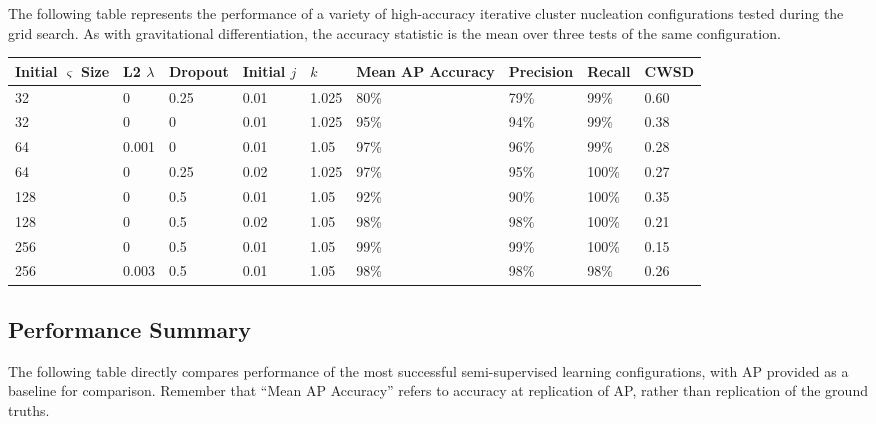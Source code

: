 \documentclass[10pt]{article}
\begin{document}
The following table represents the performance of a variety of high-accuracy iterative cluster nucleation configurations tested during the grid search. As with gravitational differentiation, the accuracy statistic is the mean over three tests of the same configuration.

\begin{minipage}{\textwidth}
    \begin{center}
        \begin{tabular}{|l|l|l|l|l|l|l|l|l|}
            \hline
            Initial $\varsigma$ Size & L2 $\lambda$ & Dropout & Initial $j$ & $k$ & Mean AP Accuracy & Precision & Recall & CWSD \\
            \hline
            32 & 0 & 0.25 & 0.01 & 1.025 & 80\% & 79\% & 99\% & 0.60 \\
            \hline
            32 & 0 & 0 & 0.01 & 1.025 & 95\% & 94\% & 99\% & 0.38 \\
            \hline
            64 & 0.001 & 0 & 0.01 & 1.05 & 97\% & 96\% & 99\% & 0.28 \\
            \hline
            64 & 0 & 0.25 & 0.02 & 1.025 & 97\% & 95\% & 100\% & 0.27 \\
            \hline
            128 & 0 & 0.5 & 0.01 & 1.05 & 92\% & 90\% & 100\% & 0.35 \\
            \hline
            128 & 0 & 0.5 & 0.02 & 1.05 & 98\% & 98\% & 100\% & 0.21 \\
            \hline
            256 & 0 & 0.5 & 0.01 & 1.05 & 99\% & 99\% & 100\% & 0.15 \\
            \hline
            256 & 0.003 & 0.5 & 0.01 & 1.05 & 98\% & 98\% & 98\% & 0.26 \\
            \hline
        \end{tabular}
    \end{center}
\end{minipage}

\subsection{Performance Summary}

The following table directly compares performance of the most successful semi-supervised learning configurations, with AP provided as a baseline for comparison. Remember that ``Mean AP Accuracy'' refers to accuracy at replication of AP, rather than replication of the ground truths.
\end{document}
